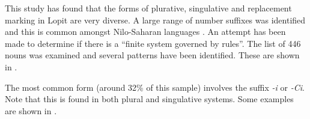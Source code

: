 \documentclass[output=paper]{langsci/langscibook}
\begin{document}
This study has found that the forms of plurative, singulative and replacement marking in Lopit are very diverse. A large range of number suffixes was identified and this is common amongst Nilo-Saharan languages \citep[219]{Dimmendaal2000}. An attempt has been made to determine if there is a “finite system governed by rules”. The list of 446 nouns was examined and several patterns have been identified. These are shown in . 

\begin{table}
\caption{Patterns for singular and plural formation}
\label{tab:moodie:9}
\end{table}

The most common form (around 32\% of this sample) involves the suffix \textit{-i} or \textit{-Ci}. Note that this is found in both plural and singulative systems. Some examples are shown in .  
\end{document}
